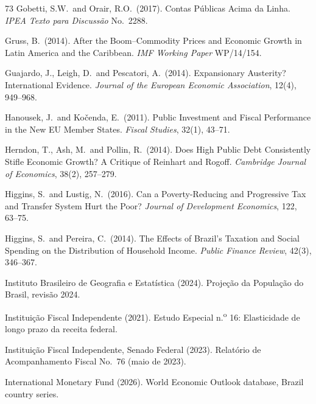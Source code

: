 \documentclass[11pt,a4paper]{article}
\begin{document}
\begin{thebibliography}{73}
 Gobetti, S.W.\ and Orair, R.O.\ (2017). Contas P\'ublicas Acima da Linha. \textit{IPEA Texto para Discuss\~ao} No.\ 2288.

 Gruss, B.\ (2014). After the Boom--Commodity Prices and Economic Growth in Latin America and the Caribbean. \textit{IMF Working Paper} WP/14/154.

 Guajardo, J., Leigh, D.\ and Pescatori, A.\ (2014). Expansionary Austerity? International Evidence. \textit{Journal of the European Economic Association}, 12(4), 949--968.

 Hanousek, J.\ and Ko\v{c}enda, E.\ (2011). Public Investment and Fiscal Performance in the New EU Member States. \textit{Fiscal Studies}, 32(1), 43--71.

 Herndon, T., Ash, M.\ and Pollin, R.\ (2014). Does High Public Debt Consistently Stifle Economic Growth? A Critique of Reinhart and Rogoff. \textit{Cambridge Journal of Economics}, 38(2), 257--279.

 Higgins, S.\ and Lustig, N.\ (2016). Can a Poverty-Reducing and Progressive Tax and Transfer System Hurt the Poor? \textit{Journal of Development Economics}, 122, 63--75.

 Higgins, S.\ and Pereira, C.\ (2014). The Effects of Brazil's Taxation and Social Spending on the Distribution of Household Income. \textit{Public Finance Review}, 42(3), 346--367.

 Instituto Brasileiro de Geografia e Estat\'istica (2024). Proje\c{c}\~ao da Popula\c{c}\~ao do Brasil, revis\~ao 2024.

 Instituição Fiscal Independente (2021). Estudo Especial n.\textsuperscript{o} 16: Elasticidade de longo prazo da receita federal.

 Instituição Fiscal Independente, Senado Federal (2023). Relat\'orio de Acompanhamento Fiscal No.\ 76 (maio de 2023).

 International Monetary Fund (2026). World Economic Outlook database, Brazil country series.


\end{thebibliography}
\end{document}
